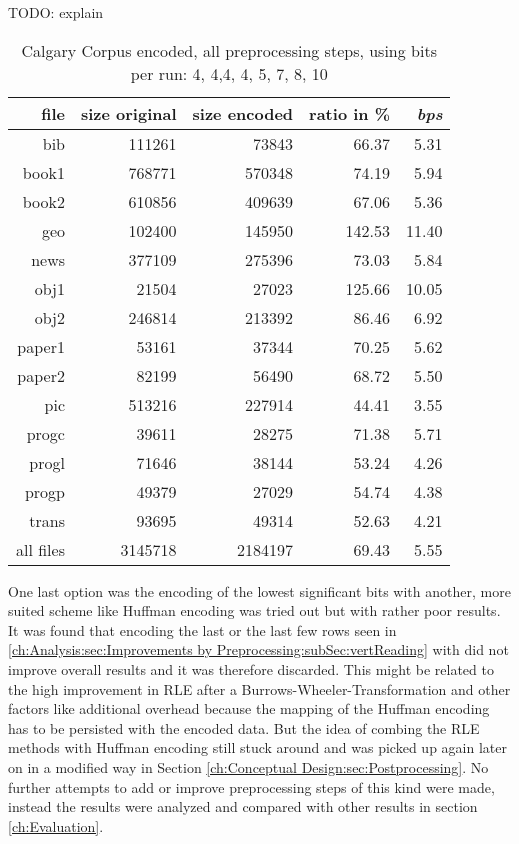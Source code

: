 {\par{
	TODO: explain
\begin{table}[h]
	\centering
	\begin{tabular}{r|r|r|r|r}	
		file & size original & size encoded & ratio in \% & \textit{bps}\\
		\hline
		bib & 111261 & 73843 & 66.37 & 5.31 \\
		book1 & 768771 & 570348 & 74.19 & 5.94 \\
		book2 & 610856 & 409639 & 67.06 & 5.36 \\
		geo & 102400 & 145950 & 142.53 & 11.40 \\
		news & 377109 & 275396 & 73.03 & 5.84 \\
		obj1 & 21504 & 27023 & 125.66 & 10.05 \\
		obj2 & 246814 & 213392 & 86.46 & 6.92 \\
		paper1 & 53161 & 37344 & 70.25 & 5.62 \\
		paper2 & 82199 & 56490 & 68.72 & 5.50 \\
		pic & 513216 & 227914 & 44.41 & 3.55 \\
		progc & 39611 & 28275 & 71.38 & 5.71 \\
		progl & 71646 & 38144 & 53.24 & 4.26 \\
		progp & 49379 & 27029 & 54.74 & 4.38 \\
		trans & 93695 & 49314 & 52.63 & 4.21 \\
		\hline
		all files & 3145718 & 2184197 & 69.43 & 5.55
	\end{tabular}
	\caption{Calgary Corpus encoded, all preprocessing steps, using bits per run: 4, 4,4, 4, 5, 7, 8, 10}
	\label{tab:t5:Calgary Corpus encoded, all preprocessing steps, using bits per run: 4, 4,4, 4, 5, 7, 8, 10}
\end{table}

\par{
One last option was the encoding of the lowest significant bits with another, more suited scheme like Huffman encoding was tried out but with rather poor results. It was found that encoding the last or the last few rows seen in \ref{ch:Analysis:sec:Improvements by Preprocessing:subSec:vertReading} with did not improve overall results and it was therefore discarded. This might be related to the high improvement in RLE after a Burrows-Wheeler-Transformation and other factors like additional overhead because the mapping of the Huffman encoding has to be persisted with the encoded data. But the idea of combing the RLE methods with Huffman encoding still stuck around and was picked up again later on in a modified way in Section \ref{ch:Conceptual Design:sec:Postprocessing}. No further attempts to add or improve preprocessing steps of this kind were made, instead the results were analyzed and compared with other results in section \ref{ch:Evaluation}.
}
}}
